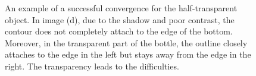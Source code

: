 \begin{figure}[htbp]
\begin{minipage}[t]{0.5\linewidth}
  \end{minipage} 
\caption[An example of a successful convergence for the half-transparent object]{An example of a
  successful convergence for the half-transparent object. In image (d), due to the shadow and poor
contrast, the contour does not completely attach to the edge of the
bottom. Moreover, in the transparent part of the bottle, the outline
closely attaches to the edge in the left but stays away from the edge
in the right. The transparency leads to the difficulties. }
\label{fig:cola}
\end{figure}





